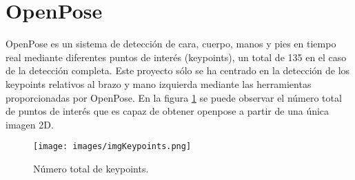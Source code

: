 \section{OpenPose}
OpenPose es un sistema de detección de cara, cuerpo, manos y pies en tiempo real mediante diferentes puntos de interés (keypoints), un total de 135 en el caso de la detección completa. Este proyecto sólo se ha centrado en la detección de los keypoints relativos al brazo y mano izquierda mediante las herramientas proporcionadas por OpenPose.
En la figura \ref{fig:imgKeypoints} se puede observar el número total de puntos de interés que es capaz de obtener openpose a partir de una única imagen 2D.\\
\begin{figure}[hbtp]
    \centering
    \texttt{[image: images/imgKeypoints.png]}
    \caption{\small Número total de keypoints.}
    \label{fig:imgKeypoints}
\end{figure}

